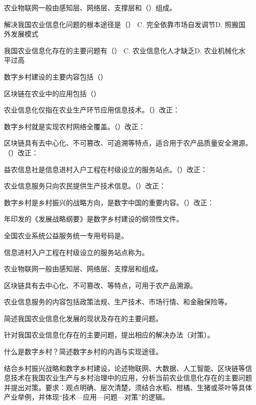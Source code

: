 \documentclass[a4paper,11pt]{article}
\begin{document}
\q 农业物联网一般由感知层、网络层、支撑层和（\quad）组成。

\q 解决我国农业信息化问题的根本途径是（\quad）
{C. 完全依靠市场自发调节}{D. 照搬国外发展模式}

\q 我国农业信息化存在的主要问题有（\quad）
{C. 农业信息化人才缺乏}{D. 农业机械化水平过高}

\q 数字乡村建设的主要内容包括（\quad）

\q 区块链在农业中的应用包括（\quad）

\q 农业信息化仅指在农业生产环节应用信息技术。\quad（\quad）\quad 改正：\fixblank

\q 数字乡村就是实现农村网络全覆盖。\quad（\quad）\quad 改正：\fixblank

\q 区块链具有去中心化、不可篡改、可追溯等特点，适合用于农产品质量安全溯源。\quad（\quad）\quad 改正：\fixblank

\q 益农信息社是信息进村入户工程在村级设立的服务站点。\quad（\quad）\quad 改正：\fixblank

\q 农业信息服务只向农民提供生产技术信息。\quad（\quad）\quad 改正：\fixblank

\q 数字乡村是乡村振兴的战略方向，是数字中国的重要内容。\quad（\quad）\quad 改正：\fixblank

 年印发的《\fillblanks[2.6cm]发展战略纲要》是数字乡村建设的纲领性文件。

\q 全国农业系统公益服务统一专用号码是\fillblanks[1.6cm]。

\q 信息进村入户工程在村级设立的服务站点称为\fillblanks[2.2cm]。

\q 农业物联网一般由感知层、网络层、支撑层和\fillblanks[1.8cm]组成。

\q 区块链具有去中心化、不可篡改、\fillblanks[2.0cm]等特点，可用于农产品溯源。

\q 农业信息服务的内容包括政策法规、生产技术、市场行情、\fillblanks[2.6cm]和金融保险等。

\newpage
{}
\q 简述我国农业信息化发展的现状及存在的主要问题。\anslines{2.4cm}

\q 针对我国农业信息化存在的主要问题，提出相应的解决办法（对策）。\anslines{2.4cm}

\q 什么是数字乡村？简述数字乡村的内涵与实现途径。\anslines{2.4cm}

\newpage
{}
\q 结合乡村振兴战略和数字乡村建设，论述物联网、大数据、人工智能、区块链等信息技术在我国农业生产与乡村治理中的应用，分析当前农业信息化存在的主要问题并提出对策。要求：观点明确、层次清楚，须结合水稻、柑橘、生猪或茶叶等具体产业举例，并体现“技术—应用—问题—对策”的逻辑。\anslines{6cm}
\end{document}
